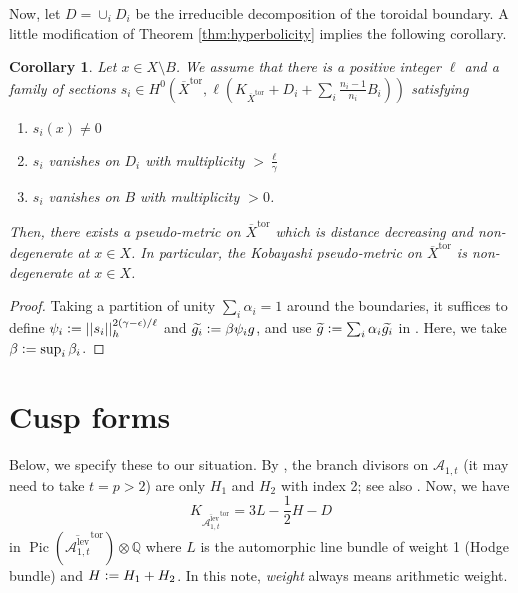 \documentclass[12pt, pdftex]{amsart}
\theoremstyle{plain}
\newtheorem{cor}[thm]{Corollary}
\theoremstyle{definition}
\numberwithin{equation}{section}
\def\A{{\mathbb A}}
\def\Q{{\mathbb Q}}
\def\Pic{\mathop{\mathrm{Pic}}\nolimits}
\def\tor{\mathrm{tor}}
\def\lev{\mathrm{lev}}
\def\A{\mathcal{A}}
\def\a{\alpha}
\newcommand{\defeq}{\vcentcolon=}
\begin{document}
Now, let $D=\cup_i D_i$ be the irreducible decomposition of the toroidal boundary.
A little modification of Theorem \ref{thm:hyperbolicity} implies the following corollary.

\begin{cor}
\label{cor:hyperbolicity}
Let $x\in X\setminus B$.
We assume that there is a positive integer $\ell$ and a family of sections $s_i\in H^0(\overline{X}^{\tor}, \ell(K_{\overline{X}^{\tor}}+D_i+\sum_i \frac{n_i-1}{n_i}B_i))$ satisfying 
\begin{enumerate}
\item $s_i(x)\neq 0$
\item $s_i$ vanishes on $D_i$ with multiplicity $>\frac{\ell}{\gamma}$
\item $s_i$ vanishes on $B$ with multiplicity $>0$.
\end{enumerate}
Then, there exists a pseudo-metric on $\overline{X}^{\tor}$ which is distance decreasing and  non-degenerate at $x\in X$.
In particular, the Kobayashi pseudo-metric on $\overline{X}^{\tor}$ is non-degenerate at $x\in X$.
\end{cor}
\begin{proof}
Taking a partition of unity $\sum_i\a_i =1$ around the boundaries, it suffices to define $\psi_i\defeq ||s_i||_h^{2(\gamma-\epsilon)/\ell}$ and $\widetilde{g_i}\defeq \beta \psi_i g$, and use $\widetilde{g}\defeq \sum_i\a_i\widetilde{g_i}$ in \cite[Proposition 2.2, 2.3, 2.4]{Rou13}.
Here, we take $\beta \defeq \sup_i{\beta_i}$.
\end{proof}

\section{Cusp forms}
Below, we specify these to our situation.
By \cite{Got61a, Got61b, Uen71}, the branch divisors on $\A_{1,t}$ (it may need to take $t=p>2$) are only $H_1$ and $H_2$ with index 2; see also \cite[section 5A]{HKW93}.
Now, we have
\[K_{\overline{\A^{\lev}_{1,t}}^{\tor}}=3L-\frac{1}{2}H-D\]
in $\Pic(\overline{\A^{\lev}_{1,t}}^{\tor})\otimes\Q$ where $L$ is the automorphic line bundle of weight 1 (Hodge bundle) and $H\defeq H_1+H_2$.
In this note, \textit{weight} always means arithmetic weight.
\end{document}
